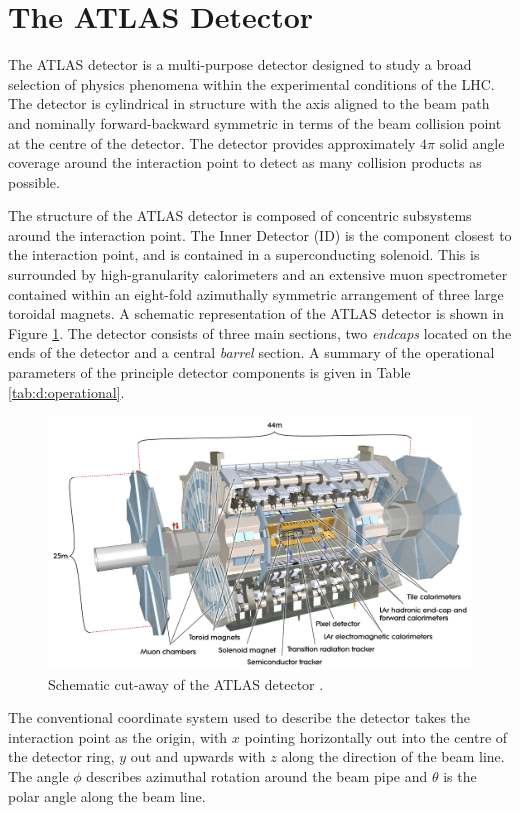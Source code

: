 \newpage
\section{The ATLAS Detector}
\label{d:ATLAS}

	The ATLAS detector \cite{ATLAS} is a multi-purpose detector designed to study a broad selection of physics phenomena within the experimental conditions of the LHC. The detector is cylindrical in structure with the axis aligned to the beam path and nominally forward-backward symmetric in terms of the beam collision point at the centre of the detector. The detector provides approximately $4\pi$ solid angle coverage around the interaction point to detect as many collision products as possible.

	The structure of the ATLAS detector is composed of concentric subsystems around the interaction point.  The Inner Detector (ID) is the component closest to the interaction point, and is contained in a superconducting solenoid. This is surrounded by high-granularity calorimeters and an extensive muon spectrometer contained within an eight-fold azimuthally symmetric arrangement of three large toroidal magnets. A schematic representation of the ATLAS detector is shown in Figure \ref{fig:t:ATLAS}. 	The detector consists of three main sections, two \textit{endcaps} located on the ends of the detector and a central \textit{barrel} section. A summary of the operational parameters of the principle detector components is given in Table \ref{tab:d:operational}.

	\begin{figure}[h]
		\centering
		\includegraphics[width=0.7\linewidth]{D/FIGS/ATLAS_SE_Corrected7}
		\caption[Schematic cut-away of the ATLAS detector]{Schematic cut-away of the ATLAS detector \cite{ATLASSchem}.}
		\label{fig:t:ATLAS}
	\end{figure}

	The conventional coordinate system used to describe the detector takes the interaction point as the origin, with $x$ pointing horizontally out into the centre of the detector ring, $y$ out and upwards with $z$ along the direction of the beam line. The angle $\phi$ describes azimuthal rotation around the beam pipe and $\theta$ is the polar angle along the beam line.


